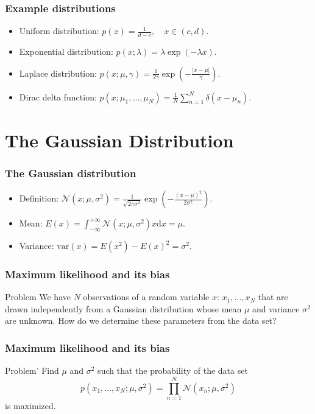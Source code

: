 \documentclass{beamer}
\begin{document}
\begin{frame}
    \frametitle{Example distributions}
    \begin{itemize}
        \item Uniform distribution: $p(x)=\frac{1}{d-c},\quad{}x\in(c,d)$.
        \item Exponential distribution: $p(x;\lambda)=\lambda\exp(-\lambda{}x)$.
        \item Laplace distribution: $p(x;\mu,\gamma)=\frac{1}{2\gamma}\exp(-\frac{|x-\mu|}{\gamma})$.
        \item Dirac delta function: $p(x;\mu_{1},\hdots,\mu_{N})=\frac{1}{N}\sum_{n=1}^{N}\delta(x-\mu_{n})$.
    \end{itemize}
\end{frame}

\section{The Gaussian Distribution}

\begin{frame}
    \frametitle{The Gaussian distribution}
    \begin{itemize}
        \item Definition: $\mathcal{N}(x;\mu,\sigma^{2})=\frac{1}{\sqrt{2\pi\sigma^{2}}}\exp(-\frac{(x-\mu)^{2}}{2\sigma^{2}})$.
        \item Mean: $E(x)=\int_{-\infty}^{+\infty}\mathcal{N}(x;\mu,\sigma^{2})x\mathrm{d}x=\mu$.
        \item Variance: $\mathrm{var}(x)=E(x^{2})-E(x)^{2}=\sigma^{2}$.
    \end{itemize}
\end{frame}

\begin{frame}
    \frametitle{Maximum likelihood and its bias}
    \begin{block}{Problem}
        We have $N$ observations of a random variable $x$: $x_{1},\hdots,x_{N}$ that are drawn independently from a Gaussian distribution whose mean $\mu$ and variance $\sigma^{2}$ are unknown. How do we determine these parameters from the data set?
    \end{block}
\end{frame}

\begin{frame}
    \frametitle{Maximum likelihood and its bias}
    \begin{block}{Problem'}
        Find $\mu$ and $\sigma^{2}$ such that the probability of the data set
        \begin{equation*}
            p(x_{1},\hdots,x_{N};\mu,\sigma^{2})=\prod_{n=1}^{N}\mathcal{N}(x_{n};\mu,\sigma^{2})
        \end{equation*}
        is maximized.
    \end{block}
\end{frame}
\end{document}
